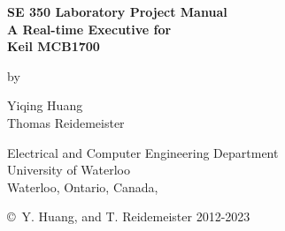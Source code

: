 \pagestyle{empty}

\begin{titlepage}
        \begin{center}
        \vspace*{1.0cm}

        \Huge
        {\bf SE 350 Laboratory Project Manual \\
             A Real-time Executive for \\
                 Keil MCB1700}

        \vspace*{1.0cm}

        \normalsize
        by \\

        \vspace*{1.0cm}

        \Large
        Yiqing Huang \\
        Thomas Reidemeister

        \vspace*{3.0cm}

        \normalsize
        Electrical and Computer Engineering Department \\
        University of Waterloo \\ 

        \vspace*{2.0cm}
\makeatletter
        Waterloo, Ontario, Canada, \@date \\
\makeatother
        
      
        
        \vspace*{1.0cm}

        \copyright\ Y. Huang, and T. Reidemeister 2012-2023 \\
        \end{center}
\end{titlepage}

\pagestyle{plain}
\setcounter{page}{2}

\cleardoublepage %

